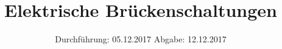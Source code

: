 

\subject{Versuch 302}
\title{Elektrische Brückenschaltungen}
\date{%
  Durchführung: 05.12.2017
  \hspace{3em}
  Abgabe: 12.12.2017
}



\maketitle
\thispagestyle{empty}
\tableofcontents
\newpage






\printbibliography{}


